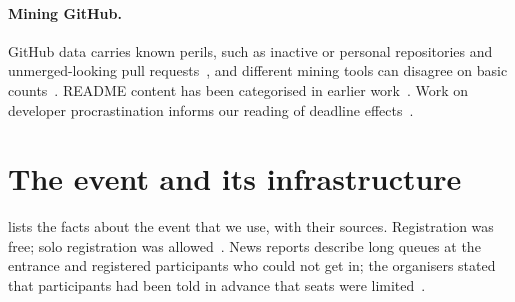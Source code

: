 \documentclass{article}
\begin{document}
\paragraph{Mining GitHub.}
GitHub data carries known perils, such as inactive or personal repositories and unmerged-looking pull requests~\cite{kalliamvakou2014perils}, and different mining tools can disagree on basic counts~\cite{hoess2025toolmatter}. README content has been categorised in earlier work~\cite{prana2019readme}. Work on developer procrastination informs our reading of deadline effects~\cite{saghi2025procrastination}.

\section{The event and its infrastructure}\label{sec:event}

 lists the facts about the event that we use, with their sources. Registration was free; solo registration was allowed~\cite{hackalem2026site}. News reports describe long queues at the entrance and registered participants who could not get in; the organisers stated that participants had been told in advance that seats were limited~\cite{qumash2026queue,ulys2026survival}.
\end{document}
